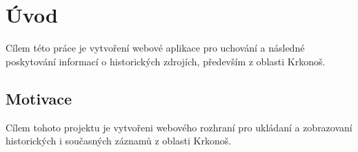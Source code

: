 \chapter{Úvod}
Cílem této práce je vytvoření webové aplikace pro uchování a
následné poskytování informací o historických zdrojích, především z oblasti Krkonoš.


\section{Motivace}
Cílem tohoto projektu je vytvořeni webového rozhraní
pro ukládaní a zobrazovaní historických i současných záznamů z
oblasti Krkonoš.
